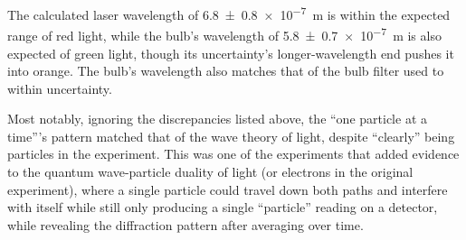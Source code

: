 \documentclass[a4paper]{scrartcl}
\begin{document}
The calculated laser wavelength of \SI{6.8 \pm 0.8 e-7}{\metre} is within the expected range of red light, while the bulb's wavelength of \SI{5.8 \pm 0.7 e-7}{\metre} is also expected of green light, though its uncertainty's longer-wavelength end pushes it into orange. The bulb's wavelength also matches that of the bulb filter used to within uncertainty.

Most notably, ignoring the discrepancies listed above, the ``one particle at a time'''s pattern matched that of the wave theory of light, despite ``clearly'' being particles in the experiment. This was one of the experiments that added evidence to the quantum wave-particle duality of light (or electrons in the original experiment), where a single particle could travel down both paths and interfere with itself while still only producing a single ``particle'' reading on a detector, while revealing the diffraction pattern after averaging over time.
\end{document}
